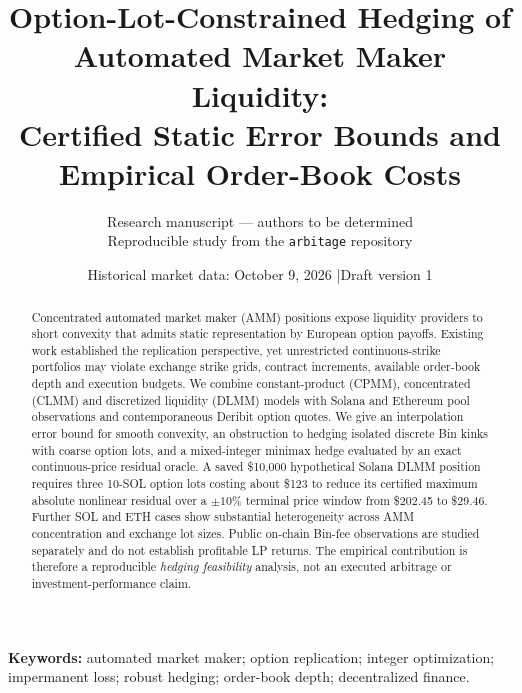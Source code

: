 \documentclass[11pt,a4paper]{article}
\title{\bfseries\color{navy}Option-Lot-Constrained Hedging of Automated Market Maker Liquidity:\\Certified Static Error Bounds and Empirical Order-Book Costs}
\author{Research manuscript --- authors to be determined\\
\small Reproducible study from the \texttt{arbitage} repository}
\date{Historical market data: October 9, 2026 \quad|\quad Draft version 1}
\begin{document}
\maketitle
\vspace{-1em}
\begin{abstract}
Concentrated automated market maker (AMM) positions expose liquidity providers to short convexity that admits static representation by European option payoffs. Existing work established the replication perspective, yet unrestricted continuous-strike portfolios may violate exchange strike grids, contract increments, available order-book depth and execution budgets. We combine constant-product (CPMM), concentrated (CLMM) and discretized liquidity (DLMM) models with Solana and Ethereum pool observations and contemporaneous Deribit option quotes. We give an interpolation error bound for smooth convexity, an obstruction to hedging isolated discrete Bin kinks with coarse option lots, and a mixed-integer minimax hedge evaluated by an exact continuous-price residual oracle. A saved \$10,000 hypothetical Solana DLMM position requires three 10-SOL option lots costing about \$123 to reduce its certified maximum absolute nonlinear residual over a $\pm10\%$ terminal price window from \$202.45 to \$29.46. Further SOL and ETH cases show substantial heterogeneity across AMM concentration and exchange lot sizes. Public on-chain Bin-fee observations are studied separately and do not establish profitable LP returns. The empirical contribution is therefore a reproducible \emph{hedging feasibility} analysis, not an executed arbitrage or investment-performance claim.
\end{abstract}
\noindent\textbf{Keywords:} automated market maker; option replication; integer optimization; impermanent loss; robust hedging; order-book depth; decentralized finance.





\end{document}
